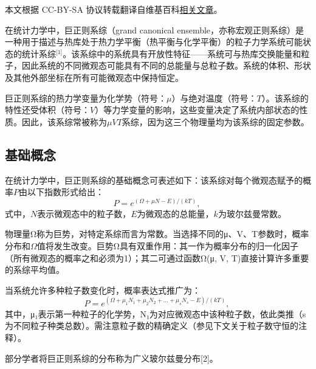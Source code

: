 
本文根据 CC-BY-SA 协议转载翻译自维基百科\href{https://en.wikipedia.org/wiki/Grand_canonical_ensemble}{相关文章}。

在统计力学中，巨正则系综（grand canonical ensemble，亦称宏观正则系综）是一种用于描述与热库处于热力学平衡（热平衡与化学平衡）的粒子力学系统可能状态的统计系综\(^\text{[1]}\)。该系综中的系统具有开放性特征——系统可与热库交换能量和粒子，因此系统的不同微观态可能具有不同的总能量与总粒子数。系统的体积、形状及其他外部坐标在所有可能微观态中保持恒定。

巨正则系综的热力学变量为化学势（符号：\(\mu\)）与绝对温度（符号：\(T\)）。该系综的特性还受体积（符号：\(V\)）等力学变量的影响，这些变量决定了系统内部状态的性质。因此，该系综常被称为\(\mu VT\)系综，因为这三个物理量均为该系综的固定参数。
\subsection{基础概念}
在统计力学中，巨正则系综的基础概念可表述如下：该系综对每个微观态赋予的概率\(P\)由以下指数形式给出：
\[
P = e^{(\Omega + \mu N - E)/(kT)},~
\]
式中，\(N\)表示微观态中的粒子数，\(E\)为微观态的总能量，\(k\)为玻尔兹曼常数。  

物理量Ω称为巨势，对特定系综而言为常数。当选择不同的μ、V、T参数时，概率分布和\(\Omega\)值将发生改变。巨势Ω具有双重作用：其一作为概率分布的归一化因子（所有微观态的概率之和必须为1）；其二可通过函数Ω(μ, V, T)直接计算许多重要的系综平均值。  

当系统允许多种粒子数变化时，概率表达式推广为：  
\[
P = e^{(\Omega + \mu_1N_1 + \mu_2N_2 + \ldots + \mu_sN_s - E)/(kT)},~
\]  
其中，μ₁表示第一种粒子的化学势，N₁为对应微观态中该种粒子数，依此类推（s为不同粒子种类总数）。需注意粒子数的精确定义（参见下文关于粒子数守恒的注释）。  

部分学者将巨正则系综的分布称为广义玻尔兹曼分布[2]。
